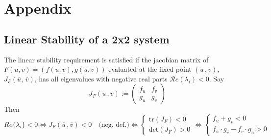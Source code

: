 \chapter{Appendix}
\section{Linear Stability of a 2x2 system} \label{app:bifurcation_diagram}
 The linear stability requirement is satisfied if the jacobian matrix of $F(u,v) = (f(u,v), g(u,v))$ evaluated at the fixed point $(\overline{u}\,, \overline{v})$, $J_F(\overline{u},\, \overline{v})$, has all eigenvalues with negative real parts $\mathcal{R}e(\lambda_i)<0$. Say 
 \begin{equation*}
 		J_{F}(\overline{u}\,, \overline{v}) := \begin{pmatrix}
 			f_u & f_v \\
 			g_u & g_v
 		\end{pmatrix}
 \end{equation*}
Then
$$
Re\{\lambda_i\} <0 \iff 	J_{F}(\overline{u}\,, \overline{v})< 0\quad  \text{(neg. def.)} \iff \begin{cases}
		\text{tr}(J_F) < 0 \\
		\text{det}(J_F)>0
	\end{cases}
	\iff \begin{cases}
		f_u + g_v < 0 \\
		f_u\cdot g_v - f_v\cdot g_u>0
	\end{cases}
$$




\citep{murray}


\newpage